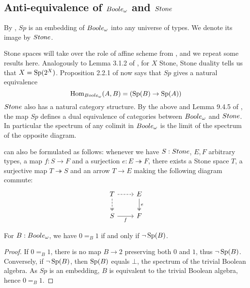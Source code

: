 \subsection{Anti-equivalence of $\Boole$ and $\Stone$}
By , $Sp$ is an embedding of $\Boole$ into any universe of types. 
We denote its image by $\Stone$. 

\begin{remark}\label{SpIsAntiEquivalence}
Stone spaces will take over the role of affine scheme from \cite{draft}, 
and we repeat some results here. 
Analogously to Lemma 3.1.2 of \cite{draft}, 
for $X$ Stone, Stone duality tells us that $X = \operatorname{Sp}(2^X)$. 
%
Proposition 2.2.1 of \cite{draft} now says that 
$Sp$ gives a natural equivalence 
\[
   \Hom_{\Boole} (A, B) = (\Sp(B) \to \Sp(A))
\]
%
$\Stone$ also has a natural category structure.
By the above and Lemma 9.4.5 of \cite{hott}, 
the map $Sp$ defines a dual equivalence of categories between $\Boole$ and $\Stone$.
In particular the spectrum of any colimit in $\Boole$ is the limit of 
the spectrum of the opposite diagram. 
\end{remark}
\begin{remark}\label{LocalChoiceSurjectionForm}
   can also be formulated as follows:
  whenever we have $S:\Stone$, $E,F$ arbitrary types, a map $f:S \to F$ and a 
  surjection $e:E \twoheadrightarrow F$, 
  there exists a Stone space $T$, a surjective map 
  $T\twoheadrightarrow S$ and an arrow $T\to E$ making the following diagram commute:
    \[\begin{tikzcd}
      T \arrow[d,dashed, two heads ] \arrow[r,dashed]&  E \arrow[d,""',two heads, "e"]\\
      S  \arrow[r, swap,"f"] & F
    \end{tikzcd}\]  
\end{remark}

\begin{lemma}\label{SpectrumEmptyIff01Equal}
  For $B:\Boole$, we have $0=_B1$ if and only if $\neg \operatorname{Sp}(B)$.
\end{lemma}
\begin{proof}
  If $0=_B1$, there is no map $B\to 2$ preserving both $0$ and $1$, thus $\neg \operatorname{Sp}(B)$. 
  Conversely, if $\neg \operatorname{Sp}(B)$, then 
  $\operatorname{Sp}(B)$ equals $\bot$, the spectrum of the trivial Boolean algebra. 
  As $Sp$ is an embedding, $B$ is equivalent to the trivial Boolean algebra, hence $0=_B1$. 
\end{proof}

